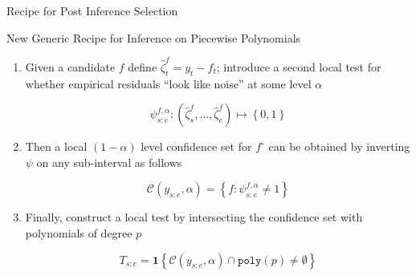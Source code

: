 \documentclass{beamer}
\begin{document}

\begin{frame}{Recipe for Post Inference Selection \citep{fryzlewicz2020narrowest}}
\begin{figure}[h]
	\centering
\end{figure}
\end{frame}



\begin{frame}{New Generic Recipe for Inference on Piecewise Polynomials}

\begin{enumerate}[<+->]
\item Given a candidate $f$ define $\hat{\zeta}_t^f = y_t - f_t$; introduce a second local test for whether empirical residuals ``look like noise'' at some level $\alpha$

\begin{equation*}
	\psi_{s:e}^{f,\alpha} : \left ( \hat{\zeta}_s^f, \dots, \hat{\zeta}_e^f \right ) \mapsto \left \{ 0, 1 \right \}
\end{equation*}

\item Then a local $(1-\alpha)$ level confidence set for $f^\circ$ can be obtained by inverting $\psi$ on any sub-interval as follows

\begin{equation*}
	\mathcal{C} \left ( y_{s:e}, \alpha \right ) = \left \{ f: \psi^{f,\alpha}_{s:e} \neq 1 \right \}
\end{equation*}

\item Finally, construct a local test by intersecting the confidence set with polynomials of degree $p$

\begin{equation*}
	T_{s:e} = \mathbf{1} \left \{ \mathcal{C} \left ( y_{s:e}, \alpha \right ) \cap \texttt{poly} (p) \neq \emptyset \right \}
\end{equation*}
\end{enumerate}
\end{frame}
\end{document}
